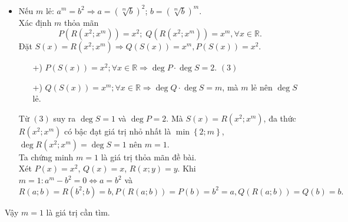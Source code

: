 \begin{bt}[VN TST 2008]
{\begin{itemize}
(vô lí) nên $m$ chẵn không thỏa mãn đề bài.
\item Nếu $m$ lẻ: $a^m=b^2\Rightarrow a=\left(\sqrt[m]{b}\right)^2$; $b=\left(\sqrt[m]{b}\right)^m$.\\
Xác định $m$ thỏa mãn
\[P\left(R(x^2;x^m)\right)=x^2;\;Q\left(R(x^2;x^m)\right)=x^m, \forall x\in\mathbb{R}.\]
Đặt $S(x)=R(x^2;x^m)\Rightarrow Q\left(S(x)\right)=x^m, P\left(S(x)\right)=x^2$.
\begin{itemize}
\item[+)] $P\left(S(x)\right)=x^2; \forall x\in\mathbb{R}\Rightarrow \deg P\cdot\deg S=2.$ \hfill$(3)$
\item[+)] $Q\left(S(x)\right)=x^m; \forall x\in\mathbb{R}\Rightarrow \deg Q\cdot\deg S=m$, mà $m$ lẻ nên $\deg S$ lẻ.
\end{itemize}
Từ $(3)$ suy ra $\deg S=1$ và $\deg P=2$. Mà $S(x)=R(x^2;x^m)$, đa thức $R(x^2;x^m)$ có bậc đạt giá trị nhỏ nhất là $\min\left\{2;m\right\}$, $\deg R(x^2;x^m)=\deg S=1$ nên $m=1$.\\
Ta chứng minh $m=1$ là giá trị thỏa mãn đề bài.\\
Xét $P(x)=x^2$, $Q(x)=x$, $R(x;y)=y$. Khi $m=1:a^m-b^2=0\Leftrightarrow a=b^2$ và
\[R(a;b)=R(b^2;b)=b, P\left(R(a;b)\right)=P(b)=b^2=a, Q\left(R(a;b)\right)=Q(b)=b.\]
\end{itemize}
Vậy $m=1$ là giá trị cần tìm.}
\end{bt}

